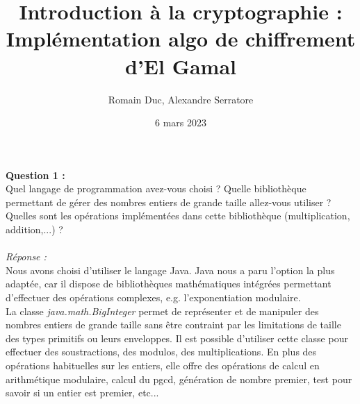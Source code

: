 \documentclass[a4paper,11pt]{article}
\title{Introduction à la cryptographie : Implémentation algo de chiffrement d'El Gamal}
\author{Romain Duc, Alexandre Serratore}
\date{6 mars 2023}
\begin{document}
    \maketitle
    \label{subsec:Q1}
    \textbf{Question 1 : \\}Quel langage de programmation avez-vous choisi ? Quelle bibliothèque permettant de gérer des nombres entiers de grande taille allez-vous utiliser ? Quelles sont les opérations implémentées dans cette bibliothèque (multiplication, addition,...) ?\\ \textit{\\Réponse :} \\Nous avons choisi d'utiliser le langage Java. Java nous a paru l'option la plus adaptée, car il dispose de bibliothèques mathématiques intégrées permettant d'effectuer des opérations complexes, e.g. l'exponentiation modulaire.\\La classe\textit{ java.math.BigInteger } permet de représenter et de manipuler des nombres entiers de grande taille sans être contraint par les limitations de taille des types primitifs ou leurs enveloppes. Il est possible d'utiliser cette classe pour effectuer des soustractions, des modulos, des multiplications. En plus des opérations habituelles sur les entiers, elle offre des opérations de calcul en arithmétique modulaire, calcul du pgcd, génération de nombre premier, test pour savoir si un entier est premier, etc...  \\\\
\end{document}
